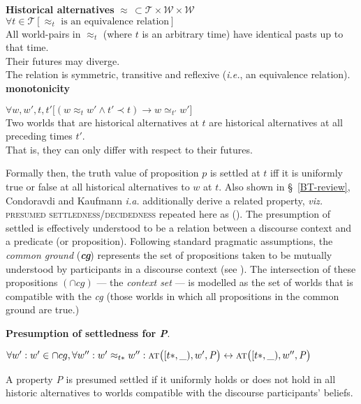 \pex\textbf{Historical alternatives }$\boldsymbol\approx\,\subset\mathcal{T\times W\times W}$
\a $\forall t\in\mathcal T[\approx_t\text{ is an equivalence relation}]$\\
All world-pairs in $\approx_t$ (where $ t $ is an arbitrary time) have identical pasts up to that time.\\Their futures may diverge.\\
The relation is symmetric, transitive and reflexive (\textit{i.e.}, an equivalence relation).
\a\textbf{monotonicity}

$ \forall w,w',t,t'\big[(w\approx_t w'\wedge t'\prec t)\to w\simeq_{t'} w'\big]$\\
Two worlds that are historical alternatives at $t$ are historical alternatives at all preceding times $t'$.\\That is, they can only differ with respect to their futures.
\xe

Formally then, the truth value of proposition $ p $ is settled at $ t $ iff it is uniformly true or false at all historical alternatives to $ w $ at $ t $. Also shown in \S~\ref{BT-review}, Condoravdi and Kaufmann \textit{i.a.} additionally derive a related property, \textit{viz.} \textsc{presumed settledness/decidedness} repeated here as (). The presumption of settled is effectively understood to be a relation between a discourse context and a predicate (or proposition). Following standard pragmatic assumptions, the \textit{common ground} (\textbf{\textit{cg}}) represents the set of propositions taken to be mutually understood by participants in a discourse context (see ). The intersection of these propositions $ (\cap cg )$ --- the \textit{context set} --- is modelled as the set of worlds that is compatible with the \textit{cg} (those worlds in which all propositions in the common ground are true.)

\ex \textbf{Presumption of settledness for \textit{P}}.


$\forall w^\prime:w^\prime\in\cap cg,\forall w^{\prime\prime}:w^\prime\approx_{t*}w^{\prime\prime}:\\
\textsc{at}\big([t*,\_),w',\mathit{P}\big)\leftrightarrow \textsc{at}\big([t*,\_),w'',\mathit{P}\big)$


A property \textit{P} is presumed settled if it uniformly holds or does not hold in all historic alternatives to worlds compatible with the discourse participants' beliefs.%

